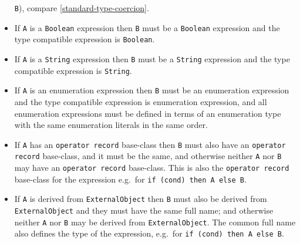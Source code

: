 \begin{itemize}
  \lstinline!B!), compare \cref{standard-type-coercion}.
\item
  If \lstinline!A! is a \lstinline!Boolean! expression then \lstinline!B! must be a \lstinline!Boolean! expression and
  the type compatible expression is \lstinline!Boolean!.
\item
  If \lstinline!A! is a \lstinline!String! expression then \lstinline!B! must be a \lstinline!String! expression and the
  type compatible expression is \lstinline!String!.
\item
  If \lstinline!A! is an enumeration expression then \lstinline!B! must be an enumeration
  expression and the type compatible expression is enumeration
  expression, and all enumeration expressions must be defined in terms
  of an enumeration type with the same enumeration literals in the same
  order.
\item
  If \lstinline!A! has an \lstinline!operator record! base-class then \lstinline!B! must also have an
  \lstinline!operator record! base-class, and it must be the same, and otherwise
  neither \lstinline!A! nor \lstinline!B! may have an \lstinline!operator record! base-class. This is also
  the \lstinline!operator record! base-class for the expression e.g.\ for
  \lstinline!if (cond) then A else B!.
\item
  If \lstinline!A! is derived from \lstinline!ExternalObject! then \lstinline!B! must also be derived from
  \lstinline!ExternalObject! and they must have the same full name; and otherwise
  neither \lstinline!A! nor \lstinline!B! may be derived from \lstinline!ExternalObject!. The common full
  name also defines the type of the expression, e.g.\ for \lstinline!if (cond) then A else B!.
\end{itemize}

